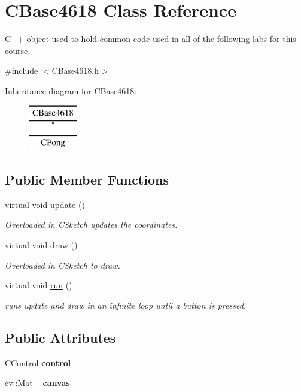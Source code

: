 \hypertarget{class_c_base4618}{}\section{C\+Base4618 Class Reference}
\label{class_c_base4618}


C++ object used to hold common code used in all of the following labs for this course.  




{\ttfamily \#include $<$C\+Base4618.\+h$>$}

Inheritance diagram for C\+Base4618\+:\begin{figure}[H]
\begin{center}
\leavevmode
\includegraphics[height=2.000000cm]{class_c_base4618}
\end{center}
\end{figure}
\subsection*{Public Member Functions}
\begin{DoxyCompactItemize}
\item 
virtual void \hyperlink{class_c_base4618_ae1ac81eaa56ded6600262c361f723cb8}{update} ()
\begin{DoxyCompactList}\small\item\em Overloaded in C\+Sketch updates the coordinates. \end{DoxyCompactList}\item 
virtual void \hyperlink{class_c_base4618_a853327d563d064bb31db241861c4d291}{draw} ()
\begin{DoxyCompactList}\small\item\em Overloaded in C\+Sketch to draw. \end{DoxyCompactList}\item 
virtual void \hyperlink{class_c_base4618_a535e816d735d10d6048dd39cd893d393}{run} ()
\begin{DoxyCompactList}\small\item\em runs update and draw in an infinite loop until a button is pressed. \end{DoxyCompactList}\end{DoxyCompactItemize}
\subsection*{Public Attributes}
\begin{DoxyCompactItemize}
\item 
\hypertarget{class_c_base4618_aa07dc8a46156de408c94acf90f46043a}{}\label{class_c_base4618_aa07dc8a46156de408c94acf90f46043a} 
\hyperlink{class_c_control}{C\+Control} {\bfseries control}
\item 
\hypertarget{class_c_base4618_a1b925f757247b33ca2072f777f24582d}{}\label{class_c_base4618_a1b925f757247b33ca2072f777f24582d} 
cv\+::\+Mat {\bfseries \+\_\+canvas}
\end{DoxyCompactItemize}


